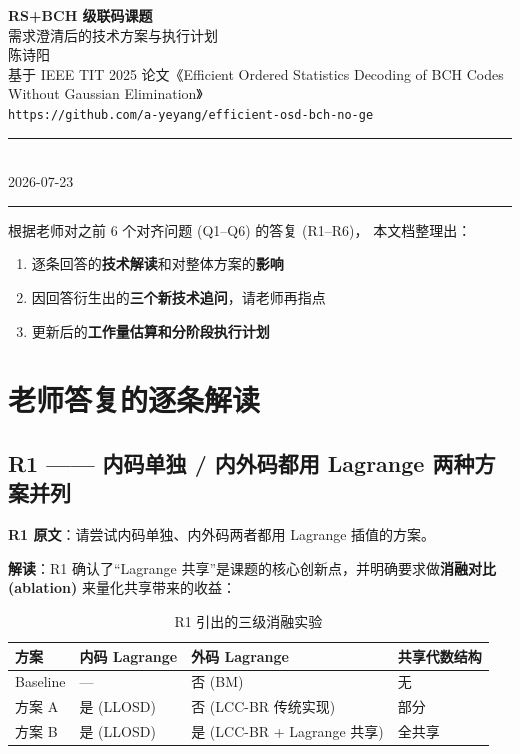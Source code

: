 \documentclass[11pt,a4paper]{article}
\begin{document}
\begin{center}
{\Large\bfseries RS+BCH 级联码课题}\\[4pt]
{\large 需求澄清后的技术方案与执行计划}\\[16pt]
{\normalsize 陈诗阳\\
基于 IEEE TIT 2025 论文《Efficient Ordered Statistics Decoding of BCH Codes Without Gaussian Elimination》\\
\vspace{2pt}
\texttt{https://github.com/a-yeyang/efficient-osd-bch-no-ge}}\\[10pt]
\rule{0.9\textwidth}{0.4pt}\\[6pt]
{\footnotesize 2026-07-23}\\
\rule{0.9\textwidth}{0.4pt}
\end{center}

\vspace{6pt}
\begin{keybox}[title=\textbf{文档目的}]
根据老师对之前 6 个对齐问题 (Q1--Q6) 的答复 (R1--R6)，
本文档整理出：
\begin{enumerate}[leftmargin=1.5em, itemsep=1pt, topsep=2pt]
\item 逐条回答的\textbf{技术解读}和对整体方案的\textbf{影响}
\item 因回答衍生出的\textbf{三个新技术追问}，请老师再指点
\item 更新后的\textbf{工作量估算和分阶段执行计划}
\end{enumerate}
\end{keybox}

\section{老师答复的逐条解读}

\subsection{R1 —— 内码单独 / 内外码都用 Lagrange 两种方案并列}

\begin{quotebox}
\textbf{R1 原文}：请尝试内码单独、内外码两者都用 Lagrange 插值的方案。
\end{quotebox}

\textbf{解读}：R1 确认了``Lagrange 共享''是课题的核心创新点，并明确要求做\textbf{消融对比 (ablation)}
来量化共享带来的收益：

\begin{table}[!ht]
\centering
\begin{tabularx}{\textwidth}{lXXX}
\toprule
\textbf{方案} & \textbf{内码 Lagrange} & \textbf{外码 Lagrange} & \textbf{共享代数结构} \\
\midrule
Baseline & --- & 否 (BM) & 无 \\
方案 A & 是 (LLOSD) & 否 (LCC-BR 传统实现) & 部分 \\
方案 B & 是 (LLOSD) & 是 (LCC-BR + Lagrange 共享) & 全共享 \\
\bottomrule
\end{tabularx}
\caption{R1 引出的三级消融实验}
\end{table}
\end{document}
